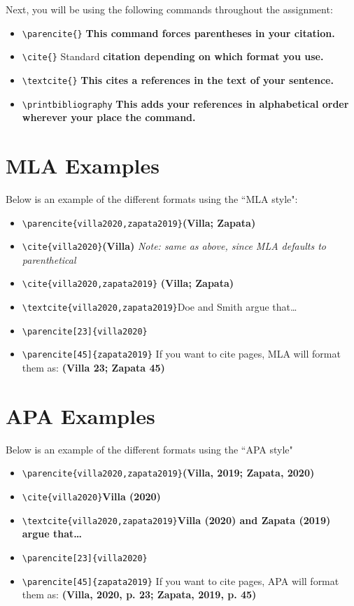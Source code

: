 \documentclass{article}
\begin{document}
Next, you will be using the following commands throughout the assignment: 

\begin{itemize}
    \item \verb|\parencite{}| \textbf{This command forces parentheses in your citation.}
    \item \verb|\cite{}| Standard \textbf{citation depending on which format you use. }
    \item \verb|\textcite{}| \textbf{This cites a references in the text of your sentence.}
    \item \verb|\printbibliography| \textbf{This adds your references in alphabetical order wherever your place the command.}
\end{itemize}

\section*{MLA Examples}

Below is an example of the different formats using the ``MLA style": 

\begin{itemize}
    \item \verb|\parencite{villa2020,zapata2019}|\textrightarrow\textbf{(Villa; Zapata)}
    \item \verb|\cite{villa2020}|\textrightarrow\textbf{(Villa)} \textit{Note: same as above, since MLA defaults to parenthetical}
    \item \verb|\cite{villa2020,zapata2019}| \textrightarrow \textbf{(Villa; Zapata)} 
    \item \verb|\textcite{villa2020,zapata2019}|\textrightarrow Doe and Smith argue that…
    \item \verb|\parencite[23]{villa2020}|
    \item \verb|\parencite[45]{zapata2019}| \textrightarrow If you want to cite pages, MLA will format them as: \textbf{(Villa 23; Zapata 45)}
\end{itemize}

\section*{APA Examples}
Below is an example of the different formats using the ``APA style" 

\begin{itemize}
    \item \verb|\parencite{villa2020,zapata2019}|\textrightarrow\textbf{(Villa, 2019; Zapata, 2020)}
    \item \verb|\cite{villa2020}|\textrightarrow \textbf{Villa (2020)} 
    \item \verb|\textcite{villa2020,zapata2019}|\textrightarrow \textbf{Villa (2020) and Zapata (2019) argue that…}
    \item \verb|\parencite[23]{villa2020}|
    \item \verb|\parencite[45]{zapata2019}| \textrightarrow If you want to cite pages, APA will format them as: \textbf{(Villa, 2020, p. 23; Zapata, 2019, p. 45)}
\end{itemize}
\end{document}
